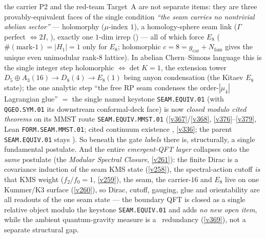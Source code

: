 \documentclass[11pt,a4paper]{article}
\newcommand{\gcar}{g_{\mathrm{car}}}
\newcommand{\Nfam}{N_{\mathrm{fam}}}
\begin{document}
the carrier P2 and the red-team Target~A are not separate items: they are three provably-equivalent faces of
the single condition \emph{``the seam carries no nontrivial abelian sector''} --- holomorphy ($\mu$-index
$1$), a homology-sphere seam link ($\Gamma$ perfect $\Leftrightarrow2I$, ),
exactly one $1$-dim irrep () --- all of which force $E_8$
($\#(\text{mark-}1)=|H_1|=1$ only for $E_8$; holomorphic $c=8=\gcar+\Nfam$ gives the unique even unimodular
rank-$8$ lattice). In abelian Chern--Simons language this is the single integer step holomorphic
$\Leftrightarrow\det K=1$, the extension tower $D_5{\oplus}A_3(16)\to D_8(4)\to E_8(1)$ being anyon
condensation (the Kitaev $E_8$ state); the one analytic step ``the free RP seam condenses the
order-$|\mu_4|$ Lagrangian glue'' $=$ the single named keystone \texttt{SEAM.EQUIV.01} (with
\texttt{QGEO.SYM.01} its downstream conformal-deck face) is now \emph{closed modulo cited theorems} on its MMST
route \texttt{SEAM.EQUIV.MMST.01}
(\vref{v367}/\vref{v368}, \vref{v376}--\vref{v379}, Lean \texttt{FORM.SEAM.MMST.01}; cited continuum existence \mO,
\vref{v336}; the parent \texttt{SEAM.EQUIV.01} stays \mO). So beneath the gate \emph{labels} there is,
structurally, a single fundamental postulate. And the entire \emph{emergent-QFT layer} collapses onto the
\emph{same} postulate (the \emph{Modular Spectral Closure}, \vref{v261}): the finite Dirac is a
covariance induction of the seam KMS state (\vref{v258}), the spectral-action cutoff \emph{is} that KMS
weight ($f_2/f_0=1$, \vref{v259}), the seam, the carrier-$16$ and $E_8$ live on one Kummer/K3 surface
(\vref{v260}), so Dirac, cutoff, gauging, glue and orientability are all readouts of the one seam state ---
the boundary QFT is closed as a single relative object modulo the keystone \texttt{SEAM.EQUIV.01} and adds
\emph{no new open item}, while the ambient quantum-gravity measure is a \mC\ redundancy (\vref{v369}), not a separate
structural gap.
 
\end{document}
